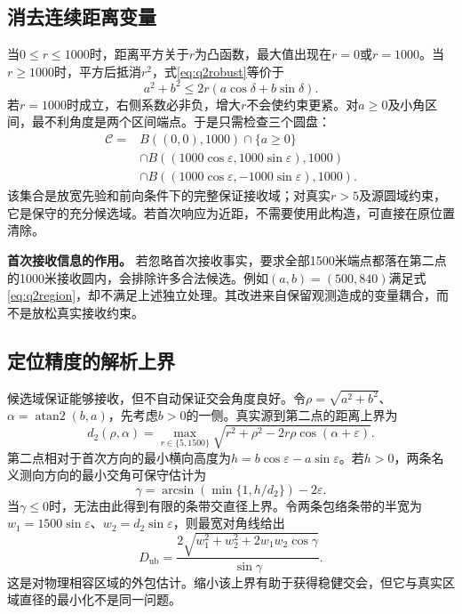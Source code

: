\documentclass[UTF8,a4paper,12pt,fontset=fandol]{ctexart}
\newcommand{\nextpage}{\clearpage}
\begin{document}
\subsection{消去连续距离变量}
当$0\le r\le1000$时，距离平方关于$r$为凸函数，最大值出现在$r=0$或$r=1000$。当$r\ge1000$时，平方后抵消$r^2$，式\eqref{eq:q2robust}等价于
\begin{equation}
 a^2+b^2\le2r(a\cos\delta+b\sin\delta).
\end{equation}
若$r=1000$时成立，右侧系数必非负，增大$r$不会使约束更紧。对$a\ge0$及小角区间，最不利角度是两个区间端点。于是只需检查三个圆盘：
\begin{equation}\label{eq:q2region}
\begin{split}
\mathcal C={}&B((0,0),1000)\cap\{a\ge0\}\\
&\cap B((1000\cos\varepsilon,1000\sin\varepsilon),1000)\\
&\cap B((1000\cos\varepsilon,-1000\sin\varepsilon),1000).
\end{split}
\end{equation}
该集合是放宽先验和前向条件下的完整保证接收域；对真实$r>5$及源圆域约束，它是保守的充分候选域。若首次响应为近距，不需要使用此构造，可直接在原位置清除。

\noindent\textbf{首次接收信息的作用。}
若忽略首次接收事实，要求全部1500米端点都落在第二点的1000米接收圆内，会排除许多合法候选。例如$(a,b)=(500,840)$满足式\eqref{eq:q2region}，却不满足上述独立处理。其改进来自保留观测造成的变量耦合，而不是放松真实接收约束。

\nextpage
\subsection{定位精度的解析上界}
候选域保证能够接收，但不自动保证交会角度良好。令$\rho=\sqrt{a^2+b^2}$、$\alpha=\operatorname{atan2}(b,a)$，先考虑$b>0$的一侧。真实源到第二点的距离上界为
\begin{equation}
 d_2(\rho,\alpha)=\max_{r\in\{5,1500\}}\sqrt{r^2+\rho^2-2r\rho\cos(\alpha+\varepsilon)}.
\end{equation}
第二点相对于首次方向的最小横向高度为$h=b\cos\varepsilon-a\sin\varepsilon$。若$h>0$，两条名义测向方向的最小交角可保守估计为
\begin{equation}
 \gamma=\arcsin\!\left(\min\{1,h/d_2\}\right)-2\varepsilon.
\end{equation}
当$\gamma\le0$时，无法由此得到有限的条带交直径上界。令两条包络条带的半宽为$w_1=1500\sin\varepsilon$、$w_2=d_2\sin\varepsilon$，则最宽对角线给出
\begin{equation}\label{eq:q2bound}
 D_{\mathrm{ub}}=\frac{2\sqrt{w_1^2+w_2^2+2w_1w_2\cos\gamma}}{\sin\gamma}.
\end{equation}
这是对物理相容区域的外包估计。缩小该上界有助于获得稳健交会，但它与真实区域直径的最小化不是同一问题。
\end{document}
